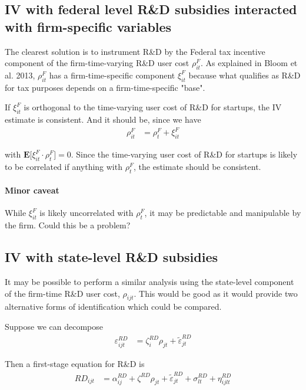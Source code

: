 \documentclass[11pt,english]{article}
\theoremstyle{remark}
\begin{document}
\subsection{IV with federal level R\&D subsidies interacted with firm-specific variables}
The clearest solution is to instrument R\&D by the Federal tax incentive component of the firm-time-varying R\&D user cost $\rho_{it}^F$. As explained in Bloom et al. 2013, $\rho_{it}^F$ has a firm-time-specific component $\xi_{it}^F$ because what qualifies as R\&D for tax purposes depends on a firm-time-specific "base".

If $\xi_{it}^F$ is orthogonal to the time-varying user cost of R\&D for startups, the IV estimate is consistent. And it should be, since we have
\begin{align*}
	\rho_{it}^F &= \rho_{t}^F + \xi_{it}^F
\end{align*}

with $\mathbf{E}\Big[\xi_{it}^F \cdot \rho_t^F \Big] = 0$. Since the time-varying user cost of R\&D for startups is likely to be correlated if anything with $\rho_t^F$, the estimate should be consistent.

\paragraph{Minor caveat} While $\xi_{it}^F$ is likely uncorrelated with $\rho_t^F$, it may be predictable and manipulable by the firm. Could this be a problem? 

\subsection{IV with state-level R\&D subsidies}

It may be possible to perform a similar analysis using the state-level component of the firm-time R\&D user cost, $\rho_{ijt}$. This would be good as it would provide two alternative forms of identification which could be compared. 

Suppose we can decompose
\begin{align*}
	\varepsilon_{ijt}^{RD} &= \zeta_i^{RD} \rho_{jt} + \tilde{\varepsilon}^{RD}_{jt}
\end{align*}

Then a first-stage equation for R\&D is   
\begin{align*}
	RD_{ijt} &= \alpha_{ij}^{RD} + \zeta^{RD} \rho_{jt} + \tilde{\varepsilon}^{RD}_{jt} + \sigma^{RD}_{lt} + \eta^{RD}_{ijlt}
\end{align*}
\end{document}

